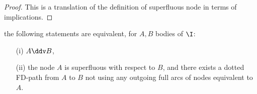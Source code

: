 \begin{proof} This is a translation of the definition of superfluous node in 
terms of implications.	
\end{proof}

\begin{proposition} \label{prop:maier.equiv_ssup_dd}
the following statements are equivalent, for $A, B$ bodies of $\I$:
\begin{itemize}
	\item[(i)] $A \ddv B$,
	\item[(ii)] the node $A$ is superfluous with respect to $B$, and there 
	exists 
	a dotted FD-path from $A$ to $B$ not using any outgoing full arcs of
	nodes equivalent to $A$.
\end{itemize}
	
\end{proposition}

